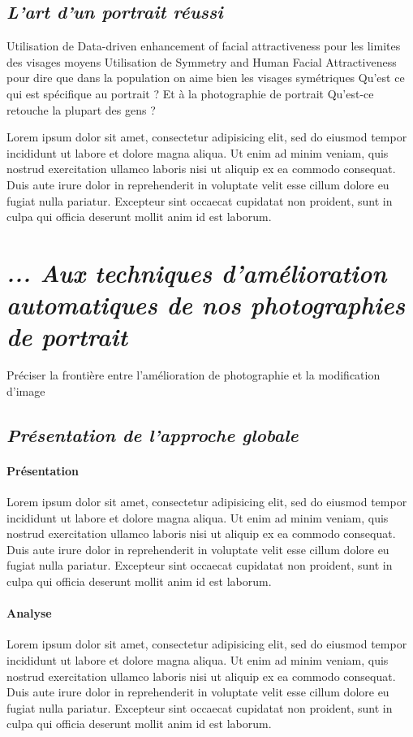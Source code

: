 \documentclass[11pt, french]{report-rd-info}
\begin{document}
\subsection{\emph{L’art d’un portrait réussi}}
Utilisation de Data-driven enhancement of facial attractiveness pour les limites des visages moyens
Utilisation de Symmetry and Human Facial Attractiveness pour dire que dans la population on aime bien les visages symétriques
Qu’est ce qui est spécifique au portrait ? Et à la photographie de portrait  
Qu’est-ce retouche la plupart des gens ?

Lorem ipsum dolor sit amet, consectetur adipisicing elit, sed do eiusmod tempor incididunt ut labore et dolore magna aliqua. Ut enim ad minim veniam, quis nostrud exercitation ullamco laboris nisi ut aliquip ex ea commodo consequat. Duis aute irure dolor in reprehenderit in voluptate velit esse cillum dolore eu fugiat nulla pariatur. Excepteur sint occaecat cupidatat non proident, sunt in culpa qui officia deserunt mollit anim id est laborum.

\section{\emph{... Aux techniques d’amélioration automatiques de nos photographies de portrait}}
Préciser la frontière entre l’amélioration de photographie et la modification d’image

\subsection{\emph{Présentation de l’approche globale}}

\paragraph{Présentation }
Lorem ipsum dolor sit amet, consectetur adipisicing elit, sed do eiusmod tempor incididunt ut labore et dolore magna aliqua. Ut enim ad minim veniam, quis nostrud exercitation ullamco laboris nisi ut aliquip ex ea commodo consequat. Duis aute irure dolor in reprehenderit in voluptate velit esse cillum dolore eu fugiat nulla pariatur. Excepteur sint occaecat cupidatat non proident, sunt in culpa qui officia deserunt mollit anim id est laborum.

\paragraph{Analyse }
Lorem ipsum dolor sit amet, consectetur adipisicing elit, sed do eiusmod tempor incididunt ut labore et dolore magna aliqua. Ut enim ad minim veniam, quis nostrud exercitation ullamco laboris nisi ut aliquip ex ea commodo consequat. Duis aute irure dolor in reprehenderit in voluptate velit esse cillum dolore eu fugiat nulla pariatur. Excepteur sint occaecat cupidatat non proident, sunt in culpa qui officia deserunt mollit anim id est laborum.
\end{document}
